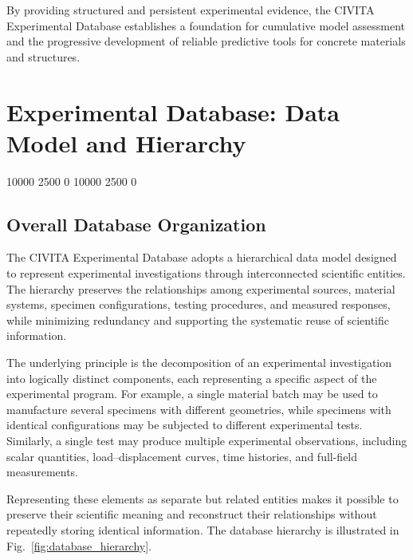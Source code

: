 By providing structured and persistent experimental
evidence, the CIVITA Experimental Database establishes
a foundation for cumulative model assessment and
the progressive development of reliable predictive
tools for concrete materials and structures.


\begingroup
\chapter{Experimental Database: Data Model and Hierarchy}
\label{chap:experimental-data-model}

 10000 2500 0
 10000 2500 0
\raggedbottom
\setlength{\intextsep}{8pt plus 2pt minus 2pt}

\section{Overall Database Organization}

The CIVITA Experimental Database adopts a hierarchical data
model designed to represent experimental investigations
through interconnected scientific entities. The hierarchy
preserves the relationships among experimental sources,
material systems, specimen configurations, testing
procedures, and measured responses, while minimizing
redundancy and supporting the systematic reuse of
scientific information.

The underlying principle is the decomposition of an
experimental investigation into logically distinct
components, each representing a specific aspect of
the experimental program. For example, a single
material batch may be used to manufacture several
specimens with different geometries, while specimens
with identical configurations may be subjected to
different experimental tests. Similarly, a single
test may produce multiple experimental observations,
including scalar quantities, load--displacement curves,
time histories, and full-field measurements.

Representing these elements as separate but related
entities makes it possible to preserve their scientific
meaning and reconstruct their relationships without
repeatedly storing identical information.
The database hierarchy is illustrated in
Fig.~\ref{fig:database_hierarchy}.

